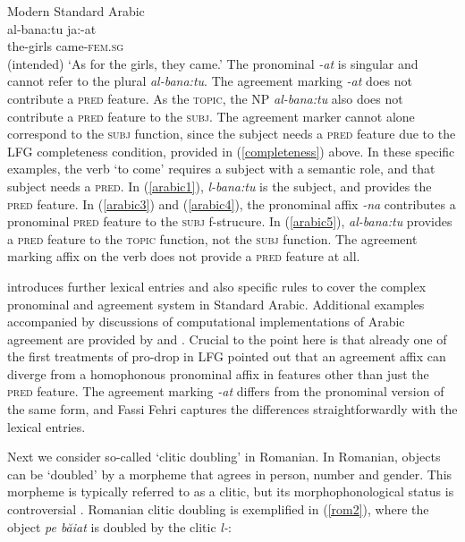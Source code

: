 \documentclass[output=paper,hidelinks]{langscibook}
\begin{document}
 
   \ea \label{arabic5}  Modern Standard Arabic\\
   \gll  *al-bana:tu ja:{\textglotstop}-at  \\
     the-girls came-\textsc{fem.sg}       \\
   \glt (intended) `As for the girls, they came.'
 \z
  The pronominal \textit{-at}  is singular and cannot refer to the plural  \textit{al-bana:tu}.  The agreement marking   \textit{-at} does not contribute a \textsc{pred} feature.   As the \textsc{topic}, the NP   \textit{al-bana:tu} also does not contribute a \textsc{pred} feature to the \textsc{subj}. The agreement marker cannot alone correspond to the \textsc{subj} function, since the subject needs a \textsc{pred} feature due to the LFG  completeness condition, provided in (\ref{completeness}) above.   In these specific examples, the verb `to come' requires a subject with a semantic role, and that subject needs a \textsc{pred}.     In  (\ref{arabic1}),  \textit{l-bana:tu} is the subject, and provides the \textsc{pred} feature. In  (\ref{arabic3}) and  (\ref{arabic4}), the pronominal affix \textit{-na} contributes a  pronominal \textsc{pred} feature to the \textsc{subj} f-strucure. 
  In (\ref{arabic5}), \textit{al-bana:tu} provides a \textsc{pred} feature to the \textsc{topic} function, not the \textsc{subj} function.   The agreement marking affix on the verb does not provide a \textsc{pred} feature at all.  

 
  \citet{FF}  introduces further lexical entries and also specific rules to   cover  the complex pronominal and agreement system in  Standard Arabic.  Additional examples accompanied by discussions of computational implementations of Arabic agreement are provided by \citet{hoyt04} and \citet{attia08-agr}.  Crucial to the point here is that   already one of the first treatments of pro-drop in LFG pointed out that  an  agreement affix can diverge from a homophonous pronominal affix in features other than just the \textsc{pred} feature.  The agreement marking \textit{-at}  differs from the pronominal version of the same form, and Fassi Fehri captures the differences straightforwardly with the lexical  entries. 
  
Next we consider so-called `clitic doubling' in Romanian.   In Romanian,    objects can  be `doubled' by  a morpheme that agrees in person, number and  gender. This morpheme is typically referred to as a clitic, but its morphophonological status   is controversial \citep{dobrovie1994, monachesi98, popescu2000, luis2004}.    Romanian clitic doubling is exemplified in (\ref{rom2}),  where the object \textit{pe  b\u{a}iat} is doubled by the clitic \textit{l-}:
   
\end{document}
